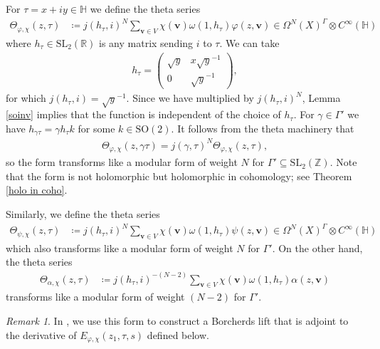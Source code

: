\documentclass[a4paper,11pt]{amsart} %
\newcommand{\8}{\infty}
\newcommand{\Z}{\mathbb{Z}}
\newcommand{\vbf}{\mathbf{v}}
\newcommand{\SO}{\mathrm{SO}}
\newcommand{\SL}{\mathrm{SL}}
\newcommand{\HH}{\mathbb{H}}
\newcommand{\R}{\mathbb{R}}
\theoremstyle{mytheoremstyle}
\theoremstyle{remark}
\newtheorem{rmk}{Remark}[section]
\numberwithin{equation}{section}
\begin{document}
For $\tau=x+iy \in \HH$ we define the theta series
\begin{align}
\Theta_{\varphi, \chi}(z,\tau) & \coloneqq j(h_\tau,i)^N  \sum_{\vbf \in V}  \chi(\vbf)\omega(1,h_\tau) \varphi(z,\vbf) \in \Omega^N(X)^\Gamma \otimes C^\8(\HH)
\end{align}
where $h_\tau \in \SL_2(\R)$ is any matrix sending $i$ to $\tau$. We can take
\begin{align}
h_\tau = \begin{pmatrix}
     \sqrt{y} & x\sqrt{y}^{-1} \\ 0 & \sqrt{y}^{-1}
 \end{pmatrix},
\end{align}
for which $j(h_\tau,i)=\sqrt{y}^{-1}$. Since we have multiplied by $j(h_\tau,i)^N$, Lemma \ref{soinv} implies that the function is independent of the choice of $h_\tau$. For $\gamma \in \Gamma'$ we have $h_{\gamma \tau}=\gamma h_\tau k$ for some $k \in \SO(2)$. It follows from the theta machinery that
\begin{align}
 \Theta_{\varphi, \chi}(z,\gamma\tau)=j(\gamma,\tau)^N \Theta_{\varphi, \chi}(z,\tau),
\end{align}
so the form transforms like a modular form of weight $N$ for $\Gamma' \subseteq \SL_2(\Z)$. Note that the form is not holomorphic but holomorphic in cohomology; see Theorem \ref{holo in coho}.

Similarly, we define the theta series
\begin{align}
\Theta_{\psi, \chi}(z,\tau) & \coloneqq j(h_\tau,i)^N  \sum_{\vbf \in V}  \chi(\vbf)\omega(1,h_\tau) \psi(z,\vbf) \in \Omega^N(X)^\Gamma \otimes C^\8(\HH)
\end{align}
which also transforms like a modular form of weight $N$ for $\Gamma'$. On the other hand, the theta series
\begin{align} \label{thetaalpha}
\Theta_{\alpha, \chi}(z,\tau) & \coloneqq j(h_\tau,i)^{-(N-2)} \sum_{\vbf \in V} \chi(\vbf)\omega(1,h_\tau)\alpha(z,\vbf)
\end{align} transforms like a modular form of weight $(N-2)$ for $\Gamma'$.
 \begin{rmk} In \cite{rbrsln2}, we use this form to construct a Borcherds lift that is adjoint to the derivative of $E_{\varphi,\chi}(z_1,\tau,s)$ defined below.
 \end{rmk}
 
\end{document}
